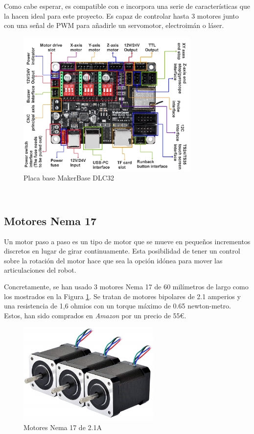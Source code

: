 Como cabe esperar, es compatible con  e incorpora una serie de características que la hacen ideal para este proyecto. Es capaz de 
controlar hasta 3 motores junto con una señal de \ac{PWM} para añadirle un servomotor, electroimán o láser.
\begin{figure} [h!]
    \begin{center}
      \includegraphics[width=9cm]{figs/MKS.png}
    \end{center}
    \caption{Placa base MakerBase DLC32}
  \end{figure}\ 

\subsection{Motores Nema 17}
\label{subsec:motores}
\noindent Un motor paso a paso es un tipo de motor que se mueve en pequeños incrementos discretos en lugar de girar continuamente. Esta  
posibilidad de tener un control sobre la rotación del motor hace que sea la opción idónea para mover las articulaciones del robot.

Concretamente, se han usado 3 motores Nema 17 de 60 milímetros de largo como los mostrados en la Figura \ref{fig:nema17_60}. Se tratan de
motores bipolares de 2.1 amperios y una resistencia de 1,6 ohmios con un torque máximo de 0.65 newton-metro. Estos, han sido comprados 
en \textit{Amazon} por un precio de 55\euro. 

\begin{figure} [h!]
    \begin{center}
      \includegraphics[width=7cm]{figs/nema17.jpg}
    \end{center}
    \caption{Motores Nema 17 de 2.1A}
    \label{fig:nema17_60}
  \end{figure}\ 

